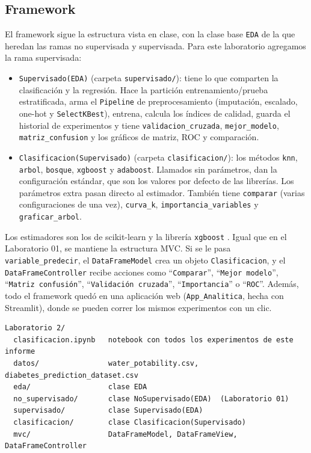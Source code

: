 \documentclass[11pt,a4paper]{article}
\let\citepOriginal\citep
\renewcommand*{\citep}[1]{\textbf{\citepOriginal{#1}}}%
\begin{document}
\subsection{Framework}
El framework sigue la estructura vista en clase, con la clase base \texttt{EDA} de la que heredan las ramas no supervisada y supervisada. Para este laboratorio agregamos la rama supervisada:
\begin{itemize}
  \item \texttt{Supervisado(EDA)} (carpeta \texttt{supervisado/}): tiene lo que comparten la clasificación y la regresión. Hace la partición entrenamiento/prueba estratificada, arma el \texttt{Pipeline} de preprocesamiento (imputación, escalado, one-hot y \texttt{SelectKBest}), entrena, calcula los índices de calidad, guarda el historial de experimentos y tiene \texttt{validacion\_cruzada}, \texttt{mejor\_modelo}, \texttt{matriz\_confusion} y los gráficos de matriz, ROC y comparación.
  \item \texttt{Clasificacion(Supervisado)} (carpeta \texttt{clasificacion/}): los métodos \texttt{knn}, \texttt{arbol}, \texttt{bosque}, \texttt{xgboost} y \texttt{adaboost}. Llamados sin parámetros, dan la configuración estándar, que son los valores por defecto de las librerías. Los parámetros extra pasan directo al estimador. También tiene \texttt{comparar} (varias configuraciones de una vez), \texttt{curva\_k}, \texttt{importancia\_variables} y \texttt{graficar\_arbol}.
\end{itemize}
Los estimadores son los de scikit-learn \citep{pedregosa2011} y la librería \texttt{xgboost} \citep{chen2016}. Igual que en el Laboratorio 01, se mantiene la estructura MVC. Si se le pasa \texttt{variable\_predecir}, el \texttt{DataFrameModel} crea un objeto \texttt{Clasificacion}, y el \texttt{DataFrameController} recibe acciones como ``\texttt{Comparar}'', ``\texttt{Mejor modelo}'', ``\texttt{Matriz confusión}'', ``\texttt{Validación cruzada}'', ``\texttt{Importancia}'' o ``\texttt{ROC}''. Además, todo el framework quedó en una aplicación web (\texttt{App\_Analitica}, hecha con Streamlit), donde se pueden correr los mismos experimentos con un clic.
\begin{verbatim}
Laboratorio 2/
  clasificacion.ipynb   notebook con todos los experimentos de este informe
  datos/                water_potability.csv, diabetes_prediction_dataset.csv
  eda/                  clase EDA
  no_supervisado/       clase NoSupervisado(EDA)  (Laboratorio 01)
  supervisado/          clase Supervisado(EDA)
  clasificacion/        clase Clasificacion(Supervisado)
  mvc/                  DataFrameModel, DataFrameView, DataFrameController
\end{verbatim}
\end{document}
